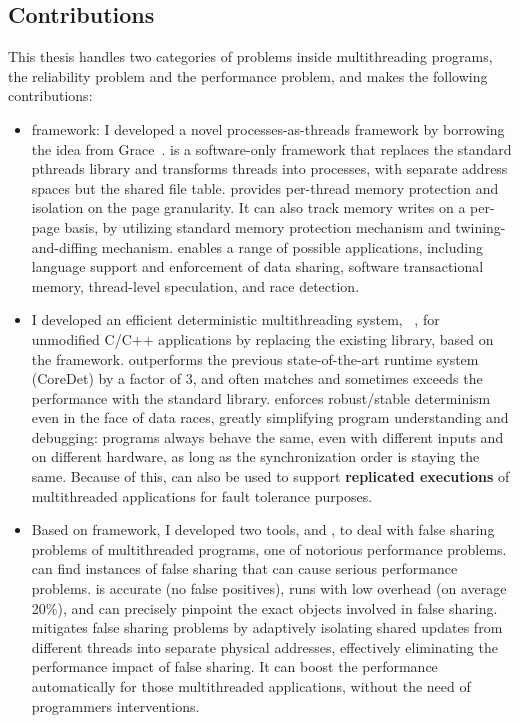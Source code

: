 \subsection*{Contributions}

This thesis handles two categories of problems inside multithreading programs, the reliability problem and the performance problem, and makes the following contributions:

\begin{itemize}
\item \Sheriff{} framework: I developed a novel processes-as-threads framework by borrowing the idea from Grace~\cite{grace}. \sheriff{} is a software-only framework that replaces the standard pthreads library and transforms
threads into processes, with separate address spaces but the shared file table. \sheriff{} provides per-thread memory protection and isolation on the page granularity. It can also track memory writes on a per-page basis, by utilizing standard memory protection mechanism and  twining-and-diffing mechanism. \sheriff{} enables a range of possible applications, including language support and enforcement of data sharing, software transactional memory, thread-level speculation, and race detection. 

\item I developed an efficient deterministic multithreading system, \dthreads{}~\cite{dthreads}, for unmodified C/C++ applications by replacing the existing \pthreads{} library, based on the \sheriff{} framework. \dthreads{} outperforms the previous state-of-the-art runtime system (CoreDet) by a factor of 3, and often matches and sometimes exceeds the performance with the standard \pthreads{} library. \Dthreads{} enforces robust/stable determinism even in the face of data races, greatly simplifying program understanding and debugging: programs always behave the same, even with different inputs and on different hardware, as long as the synchronization order is staying the same. Because of this, \dthreads{} can also be used to support \textbf{replicated executions} 
of multithreaded applications for fault tolerance purposes.

\item 
Based on \sheriff{} framework, I developed two tools, \SheriffDetect{} and \SheriffProtect{}, to deal with false sharing problems
of multithreaded programs, one of notorious performance problems. 
\SheriffDetect{} can find instances of false sharing that can cause serious performance problems. \SheriffDetect{} is accurate (no false positives), runs with low overhead (on average 20\%), and can precisely pinpoint the exact objects involved in false sharing.
\SheriffProtect{} mitigates false sharing problems by adaptively isolating shared 
updates from different threads into separate physical addresses, effectively 
eliminating the performance impact of false sharing. It can boost the performance automatically for those multithreaded applications, without the need of programmers interventions. 


\end{itemize}
